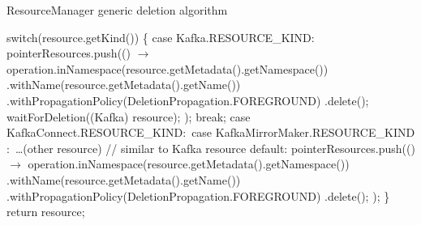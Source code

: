 \begin{algorithm}[H]
    \label{02:alg:deletionalg}
    \caption{ResourceManager generic deletion algorithm}
    \begin{algorithmic}[1]
        \State switch(resource.getKind()) \{
        \State \hspace{2em} case Kafka.RESOURCE\_KIND$:$
        \State \hspace{4em} pointerResources.push(() $\rightarrow$ {
        \State \hspace{4em} operation.inNamespace(resource.getMetadata().getNamespace())
        \State \hspace{4em} .withName(resource.getMetadata().getName())
        \State \hspace{4em} .withPropagationPolicy(DeletionPropagation.FOREGROUND)
         \State \hspace{4em} .delete();
         \State \hspace{4em} waitForDeletion((Kafka) resource);
         \State \hspace{2em} });
        \State \hspace{2em} break;
        \State \hspace{2em} case KafkaConnect.RESOURCE\_KIND$:$
        \State \hspace{2em} case KafkaMirrorMaker.RESOURCE\_KIND$:$
        \State \hspace{2em} \dots (other resource)
        \State \hspace{4em} // similar to Kafka resource
        \State \hspace{2em} default:
        \State \hspace{4em}        pointerResources.push(() $\rightarrow$  {
         \State \hspace{4em}           operation.inNamespace(resource.getMetadata().getNamespace())
         \State \hspace{4em}                   .withName(resource.getMetadata().getName())
          \State \hspace{4em}                  .withPropagationPolicy(DeletionPropagation.FOREGROUND)
          \State \hspace{4em}                  .delete();
           \State \hspace{2em}     });
           \State \}
           \State return resource;
		\EndProcedure
    \end{algorithmic}
\end{algorithm}
